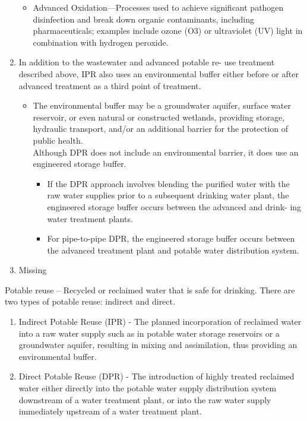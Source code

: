 \documentclass{article}
\begin{document}
\begin{enumerate}
\begin{itemize}
\item Advanced Oxidation—Processes used to achieve significant pathogen disinfection and break down organic contaminants, including pharmaceuticals; examples include ozone (O3) or ultraviolet (UV) light in combination with hydrogen peroxide.
\end{itemize}
\item In addition to the wastewater and advanced potable re- use treatment described above, IPR also uses an environmental buffer either before or after advanced treatment  as a third point of treatment. 
\begin{itemize}
\item The environmental buffer may be a groundwater aquifer, surface water reservoir, or even natural or constructed wetlands, providing storage, hydraulic transport, and/or an additional barrier for the protection of public health.\\
Although DPR does not include an environmental barrier, it does use an engineered storage buffer. 
\begin{itemize}
\item If the DPR approach involves blending the purified water with the raw water supplies prior to a subsequent drinking water plant, the engineered storage buffer occurs between the advanced and drink- ing water treatment plants. 
\item For pipe-to-pipe DPR, the engineered storage buffer occurs between the advanced treatment plant and potable water distribution system.
\end{itemize}
\end{itemize}
\item Missing
\end{enumerate}

Potable reuse – Recycled or reclaimed water that is safe for drinking.  There are two types of potable reuse:  indirect and direct. 
\begin{enumerate} 
\item Indirect Potable Reuse (IPR) - The planned incorporation of reclaimed water into a raw water supply such as in potable water storage reservoirs or a groundwater aquifer, resulting in mixing and assimilation, thus providing an environmental buffer.
\item Direct Potable Reuse (DPR) - The introduction of highly treated reclaimed water either directly into the potable water supply distribution system downstream of a water treatment plant, or into the raw water supply immediately upstream of a water treatment plant.
\end{enumerate}
\end{document}
